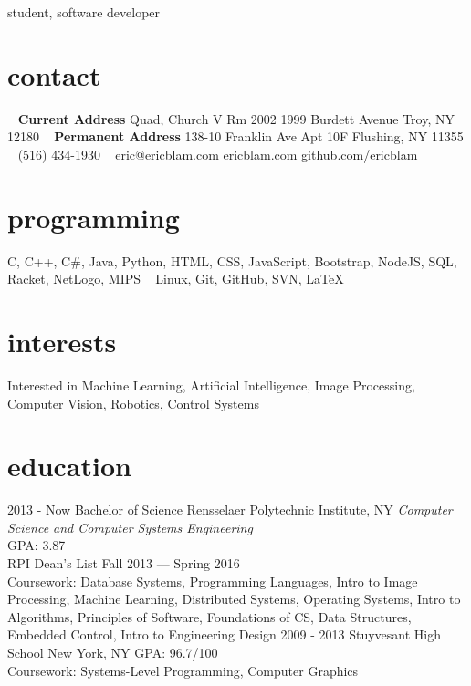 \documentclass[]{friggeri-cv}
\begin{document}
       {student, software developer}


\begin{aside}
  \section{contact}
    ~
    \textbf{Current Address}
    Quad, Church V
    Rm 2002
    1999 Burdett Avenue
    Troy, NY 12180
    ~
    \textbf{Permanent Address}
    138-10 Franklin Ave
    Apt 10F
    Flushing, NY 11355
    ~
    (516) 434-1930
    ~
    \href{mailto:adrien@friggeri.net}{eric@ericblam.com}
    \href{http://ericblam.com}{ericblam.com}
    \href{http://github.com/ericblam}{github.com/ericblam}
  \section{programming}
    C, C++, C\#, Java, Python, HTML, CSS, JavaScript, Bootstrap, NodeJS, SQL, Racket, NetLogo, MIPS
    ~
    Linux, Git, GitHub, SVN, \LaTeX
\end{aside}

\section{interests}

Interested in Machine Learning, Artificial Intelligence, Image Processing, Computer Vision, Robotics, Control Systems

\section{education}

\begin{entrylist}
  \entry
    {2013 - Now}
    {Bachelor of Science}
    {Rensselaer Polytechnic Institute, NY}
    {\emph{Computer Science and Computer Systems Engineering}\\
    GPA: 3.87\\
    RPI Dean's List Fall 2013 --- Spring 2016\\
    Coursework: Database Systems, Programming Languages, Intro to Image Processing, Machine Learning, Distributed Systems, Operating Systems, Intro to Algorithms, Principles of Software, Foundations of CS, Data Structures, Embedded Control, Intro to Engineering Design}
  \entry
    {2009 - 2013}
    {Stuyvesant High School}
    {New York, NY}
    {GPA: 96.7/100\\
    Coursework: Systems-Level Programming, Computer Graphics}
\end{entrylist}
\end{document}
